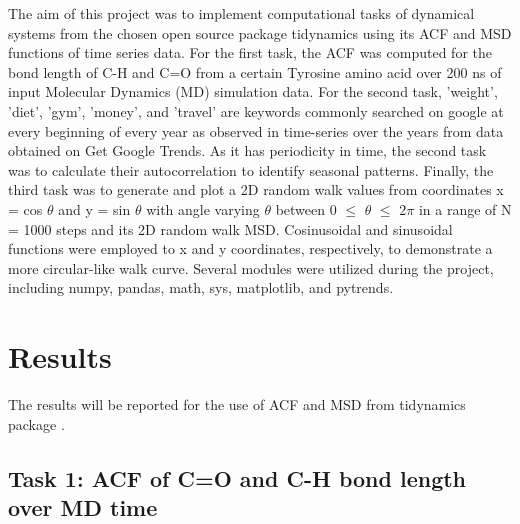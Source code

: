 \documentclass{article}
\begin{document}
The aim of this project was to implement computational tasks of dynamical systems from the chosen open source package tidynamics \cite{Buyl2018} using its ACF and MSD functions of time series data. For the first task, the ACF was computed for the bond length of C-H and C=O from a certain Tyrosine amino acid over 200 ns of input Molecular Dynamics (MD) simulation data. For the second task, 'weight', 'diet', 'gym', 'money', and 'travel' are keywords commonly searched on google at every beginning of every year as observed in time-series over the years from data obtained on Get Google Trends. As it has periodicity in time, the second task was to calculate their autocorrelation to identify seasonal patterns. Finally, the third task was to generate and plot a 2D random walk values from coordinates x = cos $\theta$ and y = sin $\theta$ with angle varying $\theta$ between 0 $\leq$ $\theta$ $\leq$ $2\pi$ in a range of N = 1000 steps and its 2D random walk MSD. Cosinusoidal and sinusoidal functions were employed to x and y coordinates, respectively, to demonstrate a more circular-like walk curve. Several modules were utilized during the project, including numpy, pandas, math, sys, matplotlib, and pytrends.

\section{Results}

The results will be reported for the use of ACF and MSD from tidynamics package \cite{Buyl2018}.

\subsection{Task 1: ACF of C=O and C-H bond length over MD time}
\end{document}
